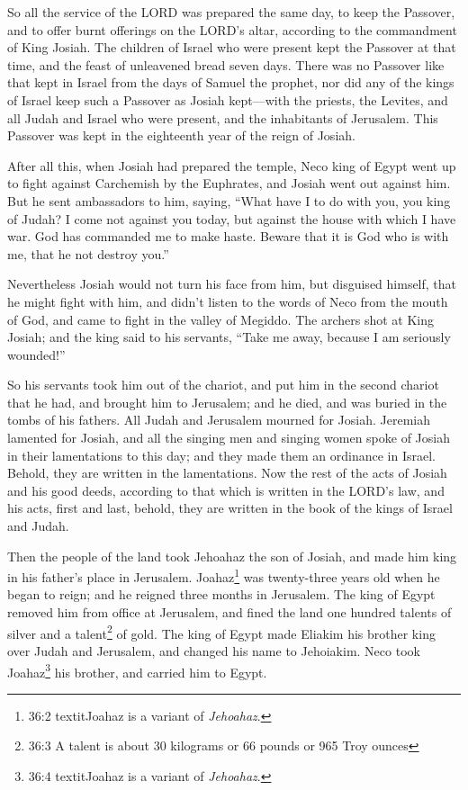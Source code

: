 \myverse{}So all the service of the LORD was prepared the same day, to
keep the Passover, and to offer burnt offerings on the LORD’s altar, according to the commandment of King
Josiah.
\myverse{}The children of Israel who were present kept the Passover at that time, and
the feast of unleavened bread seven days.
\myverse{}There was no Passover like that kept in Israel from the days of Samuel the
prophet, nor did any of the kings of Israel keep such a Passover as Josiah kept—with the priests, the
Levites, and all Judah and Israel who were present, and the inhabitants of Jerusalem.
\myverse{}This Passover was kept in the eighteenth year of the reign of Josiah.

\myverse{}After all this, when Josiah had prepared the temple, Neco king
of Egypt went up to fight against Carchemish by the Euphrates, and Josiah went out against him.
\myverse{}But he sent ambassadors to him, saying, “What have I to do with you, you
king of Judah? I come not against you today, but against the house with which I have war. God has commanded
me to make haste. Beware that it is God who is with me, that he not destroy you.”

\myverse{}Nevertheless Josiah would not turn his face from him, but disguised
himself, that he might fight with him, and didn’t listen to the words of Neco from the mouth of God, and
came to fight in the valley of Megiddo.
\myverse{}The archers shot at King Josiah; and the king said to his servants, “Take
me away, because I am seriously wounded!”

\myverse{}So his servants took him out of the chariot, and put him in
the second chariot that he had, and brought him to Jerusalem; and he died, and was buried in the tombs
of his fathers. All Judah and Jerusalem mourned for Josiah.
\myverse{}Jeremiah lamented for Josiah, and all the singing men and singing women spoke
of Josiah in their lamentations to this day; and they made them an ordinance in Israel. Behold, they are
written in the lamentations.
\myverse{}Now the rest of the acts of Josiah and his good deeds, according to that
which is written in the LORD’s law,
\myverse{}and his acts, first and last, behold, they are written in the book of the
kings of Israel and Judah.


\mychapter{} \myverse*{}Then the people of the land took Jehoahaz the son of Josiah, and
made him king in his father’s place in Jerusalem.
\myverse{}Joahaz\footnote{36:2 textit{Joahaz} is a variant of \textit{Jehoahaz}.} was twenty-three years old when he began to reign; and he reigned
three months in Jerusalem.
\myverse{}The king of Egypt removed him from office at Jerusalem, and fined the land
one hundred talents of silver and a talent\footnote{36:3 A talent is about 30 kilograms or 66 pounds or 965 Troy ounces} of gold.
\myverse{}The king of Egypt made Eliakim his brother king over Judah and Jerusalem, and
changed his name to Jehoiakim. Neco took Joahaz\footnote{36:4 textit{Joahaz} is a variant of \textit{Jehoahaz}.} his brother, and carried him to Egypt.

